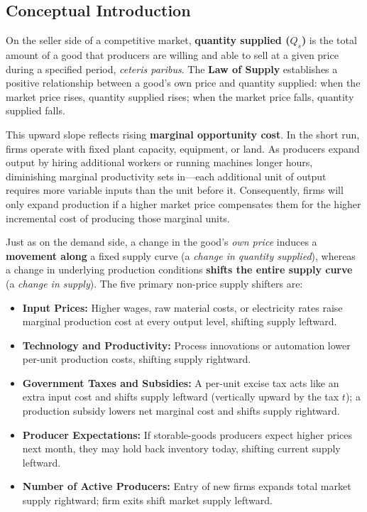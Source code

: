 \documentclass[11pt,letterpaper]{article}
\begin{document}
\subsection*{Conceptual Introduction}
On the seller side of a competitive market, \textbf{quantity supplied ($Q_s$)} is the total amount of a good that producers are willing and able to sell at a given price during a specified period, \emph{ceteris paribus}. The \textbf{Law of Supply} establishes a positive relationship between a good's own price and quantity supplied: when the market price rises, quantity supplied rises; when the market price falls, quantity supplied falls.

This upward slope reflects rising \textbf{marginal opportunity cost}. In the short run, firms operate with fixed plant capacity, equipment, or land. As producers expand output by hiring additional workers or running machines longer hours, diminishing marginal productivity sets in—each additional unit of output requires more variable inputs than the unit before it. Consequently, firms will only expand production if a higher market price compensates them for the higher incremental cost of producing those marginal units.

Just as on the demand side, a change in the good's \emph{own price} induces a \textbf{movement along} a fixed supply curve (a \emph{change in quantity supplied}), whereas a change in underlying production conditions \textbf{shifts the entire supply curve} (a \emph{change in supply}). The five primary non-price supply shifters are:
\begin{itemize}
  \item \textbf{Input Prices:} Higher wages, raw material costs, or electricity rates raise marginal production cost at every output level, shifting supply leftward.
  \item \textbf{Technology and Productivity:} Process innovations or automation lower per-unit production costs, shifting supply rightward.
  \item \textbf{Government Taxes and Subsidies:} A per-unit excise tax acts like an extra input cost and shifts supply leftward (vertically upward by the tax $t$); a production subsidy lowers net marginal cost and shifts supply rightward.
  \item \textbf{Producer Expectations:} If storable-goods producers expect higher prices next month, they may hold back inventory today, shifting current supply leftward.
  \item \textbf{Number of Active Producers:} Entry of new firms expands total market supply rightward; firm exits shift market supply leftward.
\end{itemize}
\end{document}
